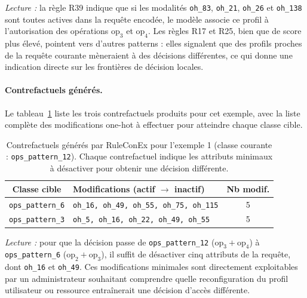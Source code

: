 \documentclass[12pt,a4paper]{article}
\begin{document}
\noindent\textit{Lecture :} la règle R39 indique que si les modalités
\texttt{oh\_83}, \texttt{oh\_21}, \texttt{oh\_26} et \texttt{oh\_138} sont
toutes actives dans la requête encodée, le modèle associe ce profil à
l'autorisation des opérations $\mathrm{op}_3$ et $\mathrm{op}_4$.
Les règles R17 et R25, bien que de score plus élevé, pointent vers d'autres
patterns : elles signalent que des profils proches de la requête courante
mèneraient à des décisions différentes, ce qui donne une indication directe
sur les frontières de décision locales.

\paragraph{Contrefactuels générés.}
Le tableau~\ref{tab:cf_ex1} liste les trois contrefactuels produits pour cet
exemple, avec la liste complète des modifications one-hot à effectuer pour
atteindre chaque classe cible.

\begin{table}[htbp]
  \centering
  \caption{Contrefactuels générés par RuleConEx pour l'exemple 1
           (classe courante : \texttt{ops\_pattern\_12}).
           Chaque contrefactuel indique les attributs minimaux à désactiver
           pour obtenir une décision différente.}
  \label{tab:cf_ex1}
  \small
  \setlength{\tabcolsep}{5pt}
  \begin{tabular}{clc}
    \toprule
    \textbf{Classe cible} & \textbf{Modifications (actif $\to$ inactif)} & \textbf{Nb modif.} \\
    \midrule
    \texttt{ops\_pattern\_6}
      & \texttt{oh\_16, oh\_49, oh\_55, oh\_75, oh\_115}
      & 5 \\
    \texttt{ops\_pattern\_3}
      & \texttt{oh\_5, oh\_16, oh\_22, oh\_49, oh\_55}
      & 5 \\
    \bottomrule
  \end{tabular}
\end{table}

\noindent\textit{Lecture :} pour que la décision passe de
\texttt{ops\_pattern\_12} ($\mathrm{op}_3 + \mathrm{op}_4$) à
\texttt{ops\_pattern\_6} ($\mathrm{op}_2 + \mathrm{op}_3$), il suffit de
désactiver cinq attributs de la requête, dont \texttt{oh\_16} et \texttt{oh\_49}.
Ces modifications minimales sont directement exploitables par un administrateur
souhaitant comprendre quelle reconfiguration du profil utilisateur ou ressource
entraînerait une décision d'accès différente.
\end{document}
